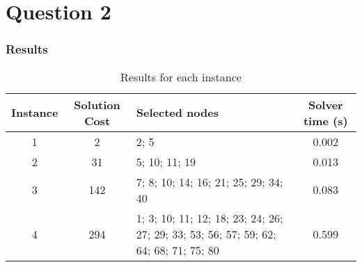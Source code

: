 \section{Question 2}

\subsubsection*{Results}

\begin{table}[h!]
	\centering
	\begin{tabularx}{\textwidth}{|c|c|X|c|}
		\hline
		\textbf{Instance} & \textbf{Solution Cost} & \textbf{Selected nodes} & \textbf{Solver time (s)} \\
		\hline
		1 & 2 & 2; 5 & 0.002 \\
		\hline
		2 & 31 & 5; 10; 11; 19 & 0.013 \\
		\hline
		3 & 142 & 7; 8; 10; 14; 16; 21; 25; 29; 34; 40 & 0.083 \\
		\hline
		4 & 294 & 1; 3; 10; 11; 12; 18; 23; 24; 26; 27; 29; 33; 53; 56; 57; 59; 62; 64; 68; 71; 75; 80 & 0.599 \\
		\hline
	\end{tabularx}
	\caption{Results for each instance}
	\label{tab:instance_costs}
\end{table}
